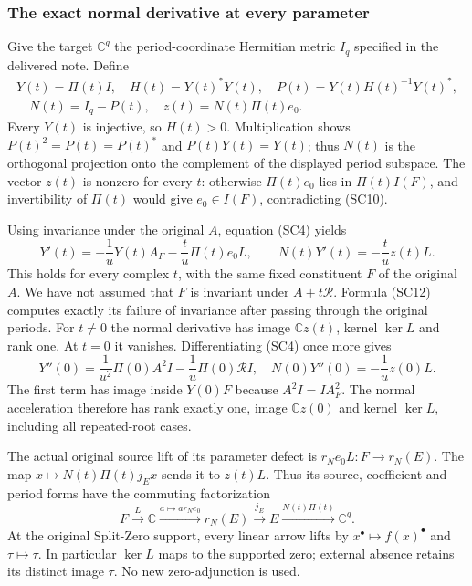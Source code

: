 \subsubsection{The exact normal derivative at every parameter}

Give the target $\mathbb C^q$ the period-coordinate Hermitian metric
$I_q$ specified in the delivered note.  Define
\[
 \begin{gathered}
 Y(t)=\Pi(t)I,
 \quad H(t)=Y(t)^*Y(t),
 \quad P(t)=Y(t)H(t)^{-1}Y(t)^*,\\
 \quad N(t)=I_q-P(t),
 \quad z(t)=N(t)\Pi(t)e_0.
 \end{gathered}
 \tag{SC11}
\]
Every $Y(t)$ is injective, so $H(t)>0$.  Multiplication shows
$P(t)^2=P(t)=P(t)^*$ and $P(t)Y(t)=Y(t)$; thus $N(t)$ is the
orthogonal projection onto the complement of the displayed period
subspace.  The vector $z(t)$ is nonzero for every $t$: otherwise
$\Pi(t)e_0$ lies in $\Pi(t)I(F)$, and invertibility of $\Pi(t)$ would
give $e_0\in I(F)$, contradicting (SC10).

Using invariance under the original $A$, equation (SC4) yields
\[
 Y'(t)=-\frac1uY(t)A_F-\frac t u\Pi(t)e_0L,
 \qquad
 \boxed{N(t)Y'(t)=-\frac t u z(t)L.}
 \tag{SC12}
\]
This holds for every complex $t$, with the same fixed constituent
$F$ of the original $A$.  We have not assumed that $F$ is invariant
under $A+t\mathcal R$.  Formula (SC12) computes exactly its failure
of invariance after passing through the original periods.  For
$t\ne0$ the normal derivative has image $\mathbb Cz(t)$, kernel
$\ker L$ and rank one.  At $t=0$ it vanishes.  Differentiating
(SC4) once more gives
\[
 Y''(0)=\frac1{u^2}\Pi(0)A^2I-\frac1u\Pi(0)\mathcal RI,
 \quad
 N(0)Y''(0)=-\frac1u z(0)L.
 \tag{SC13}
\]
The first term has image inside $Y(0)F$ because $A^2I=IA_F^2$.
The normal acceleration therefore has rank exactly one, image
$\mathbb Cz(0)$ and kernel $\ker L$, including all repeated-root cases.

The actual original source lift of its parameter defect is
$r_Ne_0L:F\to r_N(E)$.  The map
$x\mapsto N(t)\Pi(t)j_Ex$ sends it to $z(t)L$.
Thus its source, coefficient and period forms have the commuting
factorization
\[
 F\xrightarrow{L}\mathbb C\xrightarrow{a\mapsto ar_Ne_0}r_N(E)
 \xrightarrow{j_E}E\xrightarrow{N(t)\Pi(t)}\mathbb C^q.
 \tag{SC14}
\]
At the original Split-Zero support, every linear arrow lifts by
$x^\bullet\mapsto f(x)^\bullet$ and $\tau\mapsto\tau$.
In particular $\ker L$ maps to the supported zero; external absence
retains its distinct image $\tau$.  No new zero-adjunction is used.

